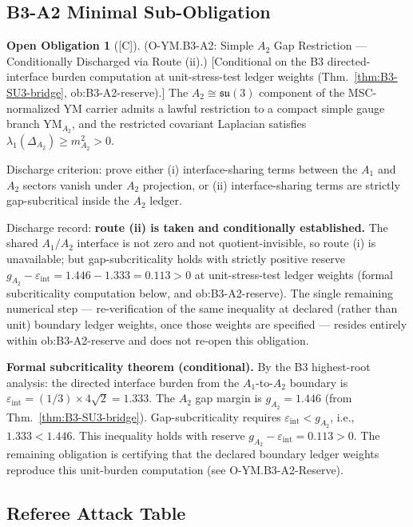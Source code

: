 \documentclass[12pt,oneside]{amsbook}
\theoremstyle{plain}
\theoremstyle{definition}
\newtheorem{obligation}[theorem]{Open Obligation}
\theoremstyle{remark}
\newcommand{\status}[1]{\textup{[#1]}}
\begin{document}
\subsection{B3-A2 Minimal Sub-Obligation}

\begin{obligation}[\status{C}]\label{ob:YM-B3-A2}
\textup{(O-YM.B3-A2: Simple $A_2$ Gap Restriction ---
Conditionally Discharged via Route (ii).)}
\textup{[Conditional on the B3 directed-interface burden computation
at unit-stress-test ledger weights
(Thm.~\ref{thm:B3-SU3-bridge}, ob:B3-A2-reserve).]}
The $A_2 \cong \mathfrak{su}(3)$ component of the MSC-normalized
YM carrier admits a lawful restriction to a compact simple gauge
branch $\mathrm{YM}_{A_2}$, and the restricted covariant Laplacian
satisfies $\lambda_1(\Delta_{A_2}) \ge m_{A_2}^2 > 0$.

Discharge criterion: prove either (i) interface-sharing terms between
the $A_1$ and $A_2$ sectors vanish under $A_2$ projection, or
(ii) interface-sharing terms are strictly gap-subcritical inside
the $A_2$ ledger.

Discharge record: \textbf{route (ii) is taken and conditionally
established.} The shared $A_1/A_2$ interface is not zero and not
quotient-invisible, so route (i) is unavailable; but
gap-subcriticality holds with strictly positive reserve
$g_{A_2} - \varepsilon_{\mathrm{int}} = 1.446 - 1.333 = 0.113 > 0$
at unit-stress-test ledger weights (formal subcriticality
computation below, and ob:B3-A2-reserve).  The single remaining
numerical step --- re-verification of the same inequality at
declared (rather than unit) boundary ledger weights, once those
weights are specified --- resides entirely within
ob:B3-A2-reserve and does not re-open this obligation.

\textbf{Formal subcriticality theorem (conditional).}
By the B3 highest-root analysis: the directed interface burden from
the $A_1$-to-$A_2$ boundary is
$\varepsilon_{\mathrm{int}} = (1/3) \times 4\sqrt{2} = 1.333$.
The $A_2$ gap margin is $g_{A_2} = 1.446$ (from
Thm.~\ref{thm:B3-SU3-bridge}).  Gap-subcriticality requires
$\varepsilon_{\mathrm{int}} < g_{A_2}$, i.e., $1.333 < 1.446$.
This inequality holds with reserve $g_{A_2} - \varepsilon_{\mathrm{int}}
= 0.113 > 0$.  The remaining obligation is certifying that the
declared boundary ledger weights reproduce this unit-burden
computation (see O-YM.B3-A2-Reserve).
\end{obligation}

\subsection{Referee Attack Table}
\end{document}
